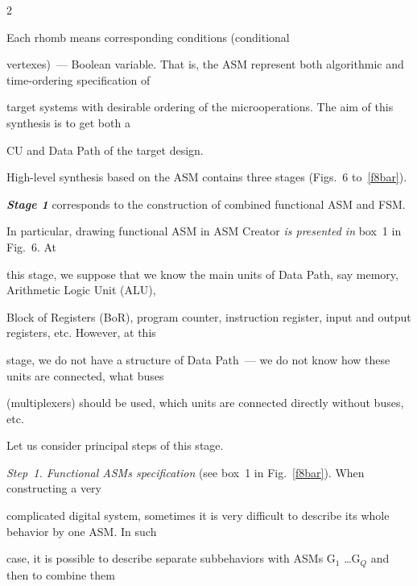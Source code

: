 \begin{multicols}{2}





\noindent


Each rhomb means corresponding conditions (con\-dition\-al


vertexes)~--- Boolean variable. That is, the ASM represent both algorithmic and time-ordering specification of


target systems with desirable ordering of the microoperations. The aim of this synthesis is to get both a


CU and Data Path of the target design.








   High-level synthesis based on the ASM contains three stages (Figs.~6 to~\ref{f8bar}).


   


{\bfseries\textit{Stage 1}} corresponds to the construction of combined functional ASM and FSM.


  


   In particular, drawing functional ASM in ASM Creator \textit{is presented in} box~1 in Fig.~6. At


this stage, we suppose that we know the main units of Data Path, say memory, Arithmetic Logic Unit (ALU),


Block of Registers (BoR), program counter, instruction register, input and output registers, etc. However, at this


stage, we do not have a structure of Data Path~--- we do not know how these units are connected, what buses


(multi\-plexers) should be used, which units are connected directly without buses, etc.





Let us consider principal steps of this stage.





\textit{Step~1. Functional ASMs specification} (see box~1 in Fig.~\ref{f8bar}). When constructing a very


complicated digital system, sometimes it is very difficult to describe its whole behavior by one ASM. In such


case, it is possible to describe separate subbehaviors with ASMs G$_1$ \ldots G$_Q$ and then to combine them



\end{multicols}
